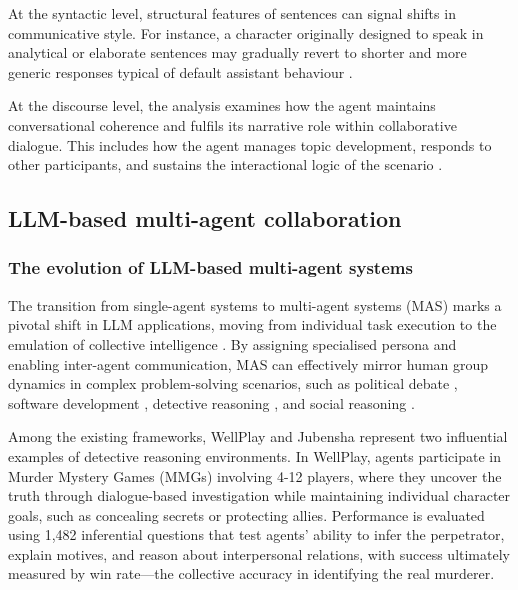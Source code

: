 \documentclass{article}
\begin{document}
At the syntactic level, structural features of sentences can signal shifts in communicative style. For instance, a character originally designed to speak in analytical or elaborate sentences may gradually revert to shorter and more generic responses typical of default assistant behaviour \citep{park2023generative, wang2024rolellm}.

At the discourse level, the analysis examines how the agent maintains conversational coherence and fulfils its narrative role within collaborative dialogue. This includes how the agent manages topic development, responds to other participants, and sustains the interactional logic of the scenario \citep{ji2025enhancing}.

\subsection{LLM-based multi-agent collaboration} \label{sec:background_multicollab}

\subsubsection{The evolution of LLM-based multi-agent systems}

The transition from single-agent systems to multi-agent systems (MAS) marks a pivotal shift in LLM applications, moving from individual task execution to the emulation of collective intelligence \citep{guo2024review, xi2025review}. By assigning specialised persona and enabling inter-agent communication, MAS can effectively mirror human group dynamics in complex problem-solving scenarios, such as political debate \citep{baltaji2024cultured}, software development \citep{qian2024chatdev}, detective reasoning \citep{wu2024jubensha,zhu2024player}, and social reasoning \citep{xiao2023simulating}.

Among the existing frameworks, WellPlay \citep{zhu2024player} and Jubensha \citep{wu2024jubensha} represent two influential examples of detective reasoning environments. In WellPlay, agents participate in Murder Mystery Games (MMGs) involving 4-12 players, where they uncover the truth through dialogue-based investigation while maintaining individual character goals, such as concealing secrets or protecting allies. Performance is evaluated using 1,482 inferential questions that test agents' ability to infer the perpetrator, explain motives, and reason about interpersonal relations, with success ultimately measured by win rate—the collective accuracy in identifying the real murderer.
\end{document}
